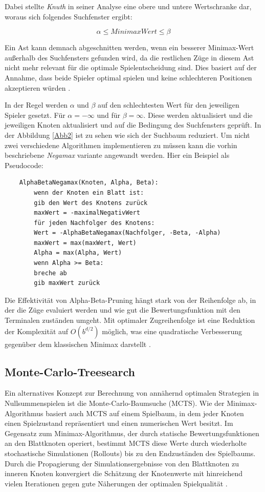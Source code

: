 Dabei stellte \textit{Knuth} \cite{KNUTH1975293} in seiner Analyse eine obere und untere Wertschranke dar, woraus sich folgendes Suchfenster ergibt:

$$\alpha \leq Minimax Wert \leq \beta$$

Ein Ast kann demnach abgeschnitten werden, wenn ein besserer Minimax-Wert außerhalb des Suchfensters gefunden wird, da die restlichen Züge in diesem Ast nicht mehr relevant für die optimale Spielentscheidung sind. Dies basiert auf der Annahme, dass beide Spieler optimal spielen und keine schlechteren Positionen akzeptieren würden \cite{KNUTH1975293}.

In der Regel werden $\alpha$ und $\beta$ auf den schlechtesten Wert für den jeweiligen Spieler gesetzt. Für $\alpha = -\infty$ und für $\beta = \infty$. Diese werden aktualisiert und die jeweiligen Knoten aktualisiert und auf die Bedingung des Suchfensters geprüft. In der Abbildung \ref{Abb2} ist zu sehen wie sich der Suchbaum reduziert.
Um nicht zwei verschiedene Algorithmen implementieren zu müssen kann die vorhin beschriebene \textit{Negamax} variante angewandt werden. Hier ein Beispiel als Pseudocode:

\begin{verbatim}
	AlphaBetaNegamax(Knoten, Alpha, Beta):
		wenn der Knoten ein Blatt ist:
		gib den Wert des Knotens zurück
		maxWert = -maximalNegativWert
		für jeden Nachfolger des Knotens:
		Wert = -AlphaBetaNegamax(Nachfolger, -Beta, -Alpha)
		maxWert = max(maxWert, Wert)
		Alpha = max(Alpha, Wert)
		wenn Alpha >= Beta:
		breche ab
		gib maxWert zurück
\end{verbatim}

\newpage


Die Effektivität von Alpha-Beta-Pruning hängt stark von der Reihenfolge ab, in der die Züge evaluiert werden und wie gut die Bewertungsfunktion mit den Terminalen zuständen umgeht. Mit optimaler Zugreihenfolge ist eine Reduktion der Komplexität auf \(O(b^{d/2})\) möglich, was eine quadratische Verbesserung gegenüber dem klassischen Minimax darstellt \cite{KNUTH1975293}.

\subsection{Monte-Carlo-Treesearch}
\label{montecarlo}
Ein alternatives Konzept zur Berechnung von annähernd optimalen Strategien in Nullsummenspielen ist die Monte-Carlo-Baumsuche (MCTS). Wie der Minimax-Algorithmus basiert auch MCTS auf einem Spielbaum, in dem jeder Knoten einen Spielzustand repräsentiert und einen numerischen Wert besitzt. Im Gegensatz zum Minimax-Algorithmus, der durch statische Bewertungsfunktionen an den Blattknoten operiert, bestimmt MCTS diese Werte durch wiederholte stochastische Simulationen (Rollouts) bis zu den Endzuständen des Spielbaums. Durch die Propagierung der Simulationsergebnisse von den Blattknoten zu inneren Knoten konvergiert die Schätzung der Knotenwerte mit hinreichend vielen Iterationen gegen gute Näherungen der optimalen Spielqualität \cite{Kocsis2006}.

